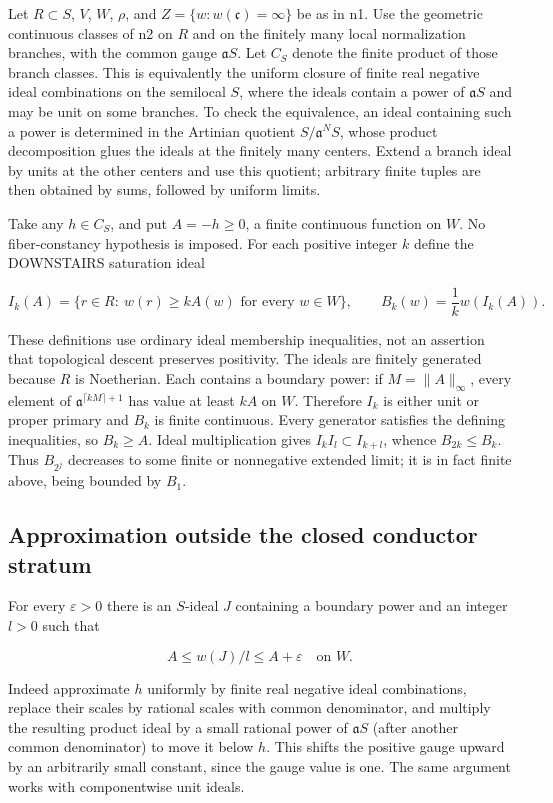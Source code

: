 \documentclass[11pt]{article}
\begin{document}
Let $R\subset S$, $V$, $W$, $\rho$, and $Z=\{w:w(\mathfrak c)=\infty\}$ be as in n1. Use the geometric continuous classes of n2 on $R$ and on the finitely many local normalization branches, with the common gauge $\mathfrak aS$. Let $C_S$ denote the finite product of those branch classes. This is equivalently the uniform closure of finite real negative ideal combinations on the semilocal $S$, where the ideals contain a power of $\mathfrak aS$ and may be unit on some branches. To check the equivalence, an ideal containing such a power is determined in the Artinian quotient $S/\mathfrak a^N S$, whose product decomposition glues the ideals at the finitely many centers. Extend a branch ideal by units at the other centers and use this quotient; arbitrary finite tuples are then obtained by sums, followed by uniform limits.

Take any $h\in C_S$, and put $A=-h\ge0$, a finite continuous function on $W$. No fiber-constancy hypothesis is imposed. For each positive integer $k$ define the DOWNSTAIRS saturation ideal

\[
I_k(A)=\{r\in R:\ w(r)\ge kA(w)\text{ for every }w\in W\},\qquad B_k(w)=\frac1k w(I_k(A)).
\]

These definitions use ordinary ideal membership inequalities, not an assertion that topological descent preserves positivity. The ideals are finitely generated because $R$ is Noetherian. Each contains a boundary power: if $M=\|A\|_\infty$, every element of $\mathfrak a^{\lceil kM\rceil+1}$ has value at least $kA$ on $W$. Therefore $I_k$ is either unit or proper primary and $B_k$ is finite continuous. Every generator satisfies the defining inequalities, so $B_k\ge A$. Ideal multiplication gives $I_kI_l\subset I_{k+l}$, whence $B_{2k}\le B_k$. Thus $B_{2^j}$ decreases to some finite or nonnegative extended limit; it is in fact finite above, being bounded by $B_1$.

\subsection{Approximation outside the closed conductor stratum}

For every $\varepsilon>0$ there is an $S$-ideal $J$ containing a boundary power and an integer $l>0$ such that

\[
A\le w(J)/l\le A+\varepsilon\quad\text{on }W.
\]

Indeed approximate $h$ uniformly by finite real negative ideal combinations, replace their scales by rational scales with common denominator, and multiply the resulting product ideal by a small rational power of $\mathfrak aS$ (after another common denominator) to move it below $h$. This shifts the positive gauge upward by an arbitrarily small constant, since the gauge value is one. The same argument works with componentwise unit ideals.
\end{document}
